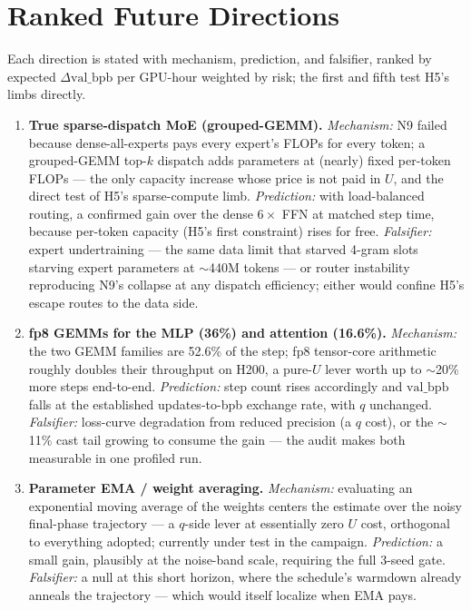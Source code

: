 \documentclass{article}
\newcommand{\valbpb}{\mathrm{val\_bpb}}
\begin{document}
\section{Ranked Future Directions}
\label{sec:future}

Each direction is stated with mechanism, prediction, and falsifier, ranked by expected $\Delta\valbpb$ per GPU-hour weighted by risk; the first and fifth test H5's limbs directly.

\begin{enumerate}
    \item \textbf{True sparse-dispatch MoE (grouped-GEMM).} \emph{Mechanism:} N9 failed because dense-all-experts pays every expert's FLOPs for every token; a grouped-GEMM top-$k$ dispatch \cite{fedus2022switch} adds parameters at (nearly) fixed per-token FLOPs --- the only capacity increase whose price is not paid in $U$, and the direct test of H5's sparse-compute limb. \emph{Prediction:} with load-balanced routing, a confirmed gain over the dense $6\times$ FFN at matched step time, because per-token capacity (H5's first constraint) rises for free. \emph{Falsifier:} expert undertraining --- the same data limit that starved 4-gram slots starving expert parameters at $\sim$440M tokens --- or router instability reproducing N9's collapse at any dispatch efficiency; either would confine H5's escape routes to the data side.
    \item \textbf{fp8 GEMMs for the MLP (36\%) and attention (16.6\%).} \emph{Mechanism:} the two GEMM families are 52.6\% of the step; fp8 tensor-core arithmetic \cite{micikevicius2022fp8} roughly doubles their throughput on H200, a pure-$U$ lever worth up to $\sim$20\% more steps end-to-end. \emph{Prediction:} step count rises accordingly and $\valbpb$ falls at the established updates-to-bpb exchange rate, with $q$ unchanged. \emph{Falsifier:} loss-curve degradation from reduced precision (a $q$ cost), or the $\sim$11\% cast tail growing to consume the gain --- the audit makes both measurable in one profiled run.
    \item \textbf{Parameter EMA / weight averaging.} \emph{Mechanism:} evaluating an exponential moving average of the weights centers the estimate over the noisy final-phase trajectory \cite{izmailov2018swa} --- a $q$-side lever at essentially zero $U$ cost, orthogonal to everything adopted; currently under test in the campaign. \emph{Prediction:} a small gain, plausibly at the noise-band scale, requiring the full 3-seed gate. \emph{Falsifier:} a null at this short horizon, where the schedule's warmdown already anneals the trajectory --- which would itself localize when EMA pays.

\end{enumerate}
\end{document}
